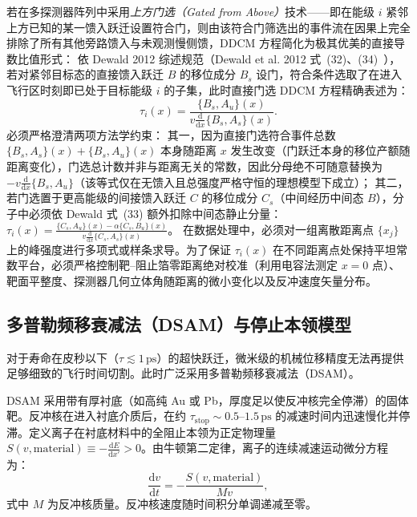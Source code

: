 若在多探测器阵列中采用\emph{上方门选（Gated from Above）}技术——即在能级 $i$ 紧邻上方已知的某一馈入跃迁设置符合门，则由该符合门筛选出的事件流在因果上完全排除了所有其他旁路馈入与未观测慢侧馈，DDCM 方程简化为极其优美的直接导数比值形式：
依 Dewald 2012 综述规范（Dewald et al. 2012 式~(32)、(34)~\cite{dewald-2012-ddcm-recoil-distance}），若对紧邻目标态的直接馈入跃迁 $B$ 的移位成分 $B_s$ 设门，符合条件选取了在进入飞行区时刻即已处于目标能级 $i$ 的子集，此时直接门选 DDCM 方程精确表述为：
\begin{equation}\label{eq:5-8-ddcm-gated}
\tau_i(x) = \frac{\{B_s, A_u\}(x)}{v \frac{\mathrm{d}}{\mathrm{d}x} \{B_s, A_s\}(x)}.
\end{equation}
必须严格澄清两项方法学约束：
其一，因为直接门选符合事件总数 $\{B_s, A_s\}(x) + \{B_s, A_u\}(x)$ 本身随距离 $x$ 发生改变（门跃迁本身的移位产额随距离变化），门选总计数并非与距离无关的常数，因此分母绝不可随意替换为 $-v \frac{\mathrm{d}}{\mathrm{d}x} \{B_s, A_u\}$（该等式仅在无馈入且总强度严格守恒的理想模型下成立）；
其二，若门选置于更高能级的间接馈入跃迁 $C$ 的移位成分 $C_s$（中间经历中间态 $B$），分子中必须依 Dewald 式~(33) 额外扣除中间态静止分量：$\tau_i(x) = \frac{\{C_s, A_u\}(x) - \alpha \{C_s, B_u\}(x)}{v \frac{\mathrm{d}}{\mathrm{d}x} \{C_s, A_s\}(x)}$。
在数据处理中，必须对一组离散距离点 $\{x_j\}$ 上的峰强度进行多项式或样条求导。为了保证 $\tau_i(x)$ 在不同距离点处保持平坦常数平台，必须严格控制靶--阻止箔零距离绝对校准（利用电容法测定 $x=0$ 点）、靶面平整度、探测器几何立体角随距离的微小变化以及反冲速度矢量分布。

\subsection{多普勒频移衰减法（DSAM）与停止本领模型}\label{subsec:5-8-3}

对于寿命在皮秒以下（$\tau \lesssim 1\,\text{ps}$）的超快跃迁，微米级的机械位移精度无法再提供足够细致的飞行时间切割。此时广泛采用多普勒频移衰减法（DSAM）。

DSAM 采用带有厚衬底（如高纯 Au 或 Pb，厚度足以使反冲核完全停滞）的固体靶。反冲核在进入衬底介质后，在约 $\tau_{\mathrm{stop}} \sim 0.5$–$1.5\,\text{ps}$ 的减速时间内迅速慢化并停滞。定义离子在衬底材料中的全阻止本领为正定物理量 $S(v, \text{material}) \equiv -\frac{\mathrm{d}E}{\mathrm{d}x'} > 0$。由牛顿第二定律，离子的连续减速运动微分方程为：
\begin{equation}\label{eq:5-8-velocity-history}
\frac{\mathrm{d}v}{\mathrm{d}t} = -\frac{S(v, \text{material})}{M v},
\end{equation}
式中 $M$ 为反冲核质量。反冲核速度随时间积分单调递减至零。

